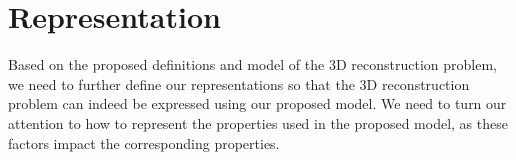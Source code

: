 \section{Representation}
\label{sec:3DRecon_Rep}
Based on the proposed definitions and model of the 3D reconstruction problem, we need to further define our representations so that the 3D reconstruction problem can indeed be expressed using our proposed model. We need to turn our attention to how to represent the properties used in the proposed model, as these factors impact the corresponding properties.







